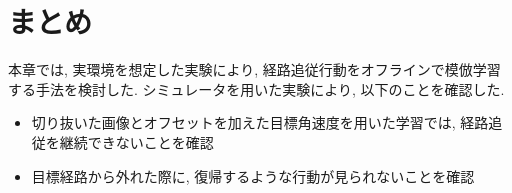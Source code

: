 \newpage
\section{まとめ}
本章では, 実環境を想定した実験により, 経路追従行動をオフラインで模倣学習する手法を検討した. シミュレータを用いた実験により, 以下のことを確認した. 

\begin{itemize}
  \item 切り抜いた画像とオフセットを加えた目標角速度を用いた学習では, 経路追従を継続できないことを確認
  \item 目標経路から外れた際に, 復帰するような行動が見られないことを確認
\end{itemize}



